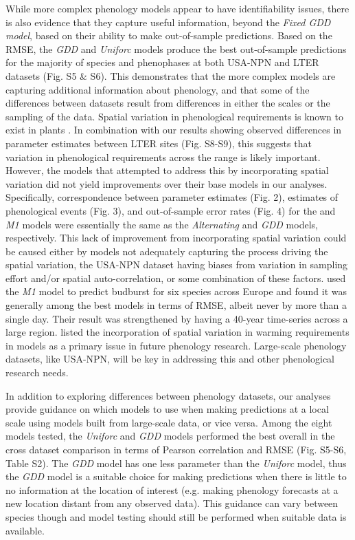 \documentclass[fleqn,12pt,lineno]{article}
\begin{document}
While more complex phenology models appear to have identifiability issues, there is also evidence that they capture useful information, beyond the \textit{Fixed GDD model}, based on their ability to make out-of-sample predictions. Based on the RMSE, the \textit{GDD} and \textit{Uniforc} models produce the best out-of-sample predictions for the majority of species and phenophases at both USA-NPN and LTER datasets (Fig. S5 \& S6). This demonstrates that the more complex models are capturing additional information about phenology, and that some of the differences between datasets result from differences in either the scales or the sampling of the data. Spatial variation in phenological requirements is known to exist in plants \citep{zhang2017}. In combination with our results showing observed differences in parameter estimates between LTER sites (Fig. S8-S9), this suggests that variation in phenological requirements across the range is likely important. However, the models that attempted to address this by incorporating spatial variation did not yield improvements over their base models in our analyses. Specifically, correspondence between parameter estimates (Fig. 2), estimates of phenological events (Fig. 3), and out-of-sample error rates (Fig. 4) for the  and \textit{M1} models were essentially the same as the \textit{Alternating} and \textit{GDD} models, respectively. This lack of improvement from incorporating spatial variation could be caused either by models not adequately capturing the process driving the spatial variation, the USA-NPN dataset having biases from variation in sampling effort and/or spatial auto-correlation, or some combination of these factors. \cite{basler2016} used the \textit{M1} model to predict budburst for six species across Europe and found it was generally among the best models in terms of RMSE, albeit never by more than a single day. Their result was strengthened by having a 40-year time-series across a large region. \cite{chuine2017} listed the incorporation of spatial variation in warming requirements in models as a primary issue in future phenology research. Large-scale phenology datasets, like USA-NPN, will be key in addressing this and other phenological research needs.

In addition to exploring differences between phenology datasets, our analyses provide guidance on which models to use when making predictions at a local scale using models built from large-scale data, or vice versa. Among the eight models tested, the \textit{Uniforc} and \textit{GDD} models performed the best overall in the cross dataset comparison in terms of Pearson correlation and RMSE (Fig. S5-S6, Table S2). The \textit{GDD} model has one less parameter than the \textit{Uniforc} model, thus the \textit{GDD} model is a suitable choice for making predictions when there is little to no information at the location of interest (e.g. making phenology forecasts at a new location distant from any observed data). This guidance can vary between species though and model testing should still be performed when suitable data is available.
\end{document}
